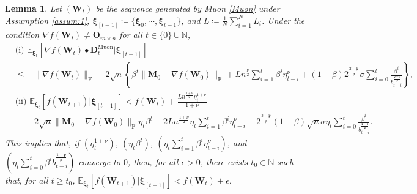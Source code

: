 \documentclass[10pt,a4paper]{amsart}
\newtheorem{lem}{Lemma}
\begin{document}
\begin{lem}\label{lem:muon_descent}
{\em 
Let $(\bm{W}_t)$ be the sequence generated by Muon \eqref{Muon} under Assumption \ref{assum:1}, $\bm{\xi}_{[t-1]} \coloneqq \{ \bm{\xi}_0, \cdots, \bm{\xi}_{t-1} \}$, and $L \coloneqq \frac{1}{N} \sum_{i=1}^N L_i$. Under the condition $\nabla f (\bm{W}_t) \neq \bm{O}_{m \times n}$ for all $t \in \{0\} \cup \mathbb{N}$,
\begin{align*}
&\text{(i) }
\mathbb{E}_{\bm{\xi}_t} \left[ \nabla f (\bm{W}_t) \bullet \bm{D}_t^{\mathrm{Muon}} |\bm{\xi}_{[t-1]} \right]\\
&\leq - \| \nabla f (\bm{W}_t) \|_{\mathrm{F}}
+ 2 \sqrt{n}
\left\{  
\beta^t \| \bm{M}_{0} - \nabla f(\bm{W}_{0}) \|_{\mathrm{F}}
+ L n^{\frac{\nu}{2}} \sum_{i=1}^t \beta^i \eta_{t-i}^\nu 
+ (1 - \beta) 2^{\frac{2 - \mathfrak{p}}{\mathfrak{p}}} \sigma
\sum_{i=0}^t 
\frac{\beta^i}{b_{t-i}^{\frac{\mathfrak{p} -1}{\mathfrak{p}}}}
\right\},\\
&\text{(ii) } 
\mathbb{E}_{\bm{\xi}_t} \left[f (\bm{W}_{t+1}) |\bm{\xi}_{[t-1]} \right]
<
f(\bm{W}_t)
+ 
\frac{L n^{\frac{1 + \nu}{2}} \eta_t^{1 + \nu}}{1 + \nu}\\
&\quad + 2 \sqrt{n} \| \bm{M}_{0} - \nabla f(\bm{W}_{0}) \|_{\mathrm{F}} \eta_t \beta^t
+ 2 L n^{\frac{1+\nu}{2}} \eta_t \sum_{i=1}^t \beta^i \eta_{t-i}^\nu
+ 2^{\frac{3 - \mathfrak{p}}{\mathfrak{p}}} (1 - \beta) \sqrt{n} \sigma \eta_t \sum_{i=0}^t 
\frac{\beta^i}{b_{t-i}^{\frac{\mathfrak{p} -1}{\mathfrak{p}}}}.
\end{align*}
This implies that, if $(\eta_t^{1 + \nu})$, $(\eta_t \beta^t)$, $(\eta_t \sum_{i=1}^t \beta^i \eta_{t-i}^\nu)$, and $(\eta_t \sum_{i=0}^t \beta^i b_{t-i}^{\frac{1- \mathfrak{p}}{\mathfrak{p}}})$ converge to $0$, then, for all $\epsilon > 0$, there exists $t_0 \in \mathbb{N}$ such that, for all $t \geq t_0$, $\mathbb{E}_{\bm{\xi}_t} \left[f (\bm{W}_{t+1}) |\bm{\xi}_{[t-1]} \right] < f(\bm{W}_t) + \epsilon$. 
}
\end{lem}
\end{document}
